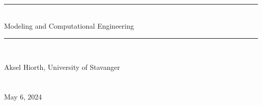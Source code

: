 \documentclass[graybox,sectrefs,envcountresetchap,open=right,final]{svmonodo}
\begin{document}

\newcommand{\exercisesection}[1]{\subsection*{#1}}






\frontmatter
\setcounter{page}{3}
\pagestyle{headings}



\thispagestyle{empty}
\hbox{\ \ }
\vfill
\begin{center}
{\huge{\bfseries{
\begin{spacing}{1.25}
{\rule{\linewidth}{0.5mm}} \\[0.4cm]
{Modeling and Computational Engineering }
\\[0.4cm] {\rule{\linewidth}{0.5mm}} \\[1.5cm]
\end{spacing}
}}}


\vspace{0.5cm}

{\Large\textsf{Aksel Hiorth, University of Stavanger${}^{}$}}\\ [3mm]

\ \\ [2mm]


\ \\ [10mm]
{\large\textsf{May 6, 2024}}
\end{center}
\vfill
\clearpage

\setpagesize
\end{document}
